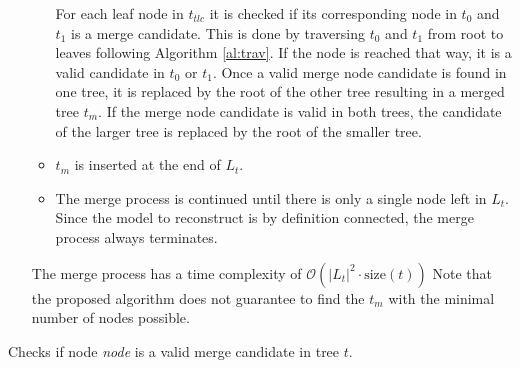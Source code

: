 \begin{enumerate}
\begin{itemize}
For each leaf node in $t_{tlc}$ it is checked if its corresponding node in $t_0$ and $t_1$ is a merge candidate.
This is done by traversing $t_0$ and $t_1$ from root to leaves following Algorithm \ref{al:trav}.
If the node is reached that way, it is a valid candidate in $t_0$ or $t_1$. 
Once a valid merge node candidate is found in one tree, it is replaced by the root of the other tree resulting in a merged tree $t_m$.
If the merge node candidate is valid in both trees, the candidate of the larger tree is replaced by the root of the smaller tree. 
\item $t_m$ is inserted at the end of $L_t$.
\item The merge process is continued until there is only a single node left in $L_t$.
Since the model to reconstruct is by definition connected, the merge process always terminates.
\end{itemize}
The merge process has a time complexity of $\mathcal{O}(\vert L_t \vert^2 \cdot \text{size}(t))$
Note that the proposed algorithm does not guarantee to find the $t_m$ with the minimal number of nodes possible. 
\end{enumerate}
\begin{algorithm}[htb]

	\nl	{}
	\caption{Checks if node \textit{node} is a valid merge candidate in tree $t$.}\label{al:trav}
\end{algorithm}

